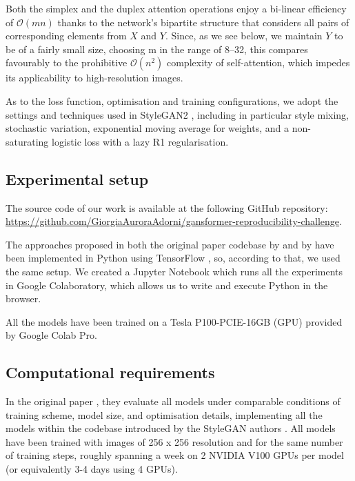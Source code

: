 \documentclass{article}
\begin{document}
Both the simplex and the duplex attention operations enjoy a bi-linear efficiency of 
$\mathcal{O}(mn)$ thanks to the network’s bipartite structure that considers all pairs of 
corresponding elements from $X$ and $Y$. Since, as we see below, we maintain $Y$ to be of a fairly 
small size, choosing m in the range of 8–32, this compares favourably to the prohibitive 	
$\mathcal{O}(n^2)$  complexity of self-attention, which impedes its applicability to high-resolution 
images.

As to the loss function, optimisation and training configurations, we adopt the settings and 
techniques used in StyleGAN2 \cite{karras2020analyzing}, including in particular style mixing, 
stochastic variation, exponential moving average for weights, and a non-saturating logistic loss with 
a lazy R1 regularisation.

\subsection{Experimental setup}	
The source code of our work is available at the following GitHub repository: 
\url{https://github.com/GiorgiaAuroraAdorni/gansformer-reproducibility-challenge}.

The approaches proposed in both the original paper codebase by \citet{karras2020analyzing} and 
by \citet{hudson2021generative} have been implemented in Python using TensorFlow 
\cite{tensorflow2015-whitepaper}, so, according to that, we used the same setup.
We created a Jupyter Notebook which runs all the experiments in Google Colaboratory, which 
allows us to write and execute Python in the browser. 

All the models have been trained on a Tesla P100-PCIE-16GB (GPU) provided by Google 
Colab Pro.

\subsection{Computational requirements}\label{sec:comput_req}

In the original paper \cite{hudson2021generative}, they evaluate all models under comparable 
conditions of training scheme, model size, and optimisation details, implementing all the models 
within the codebase introduced by the StyleGAN authors \cite{karras2020analyzing}. 
All models have been trained with images of 256 x 256 resolution and for the 
same number of training steps, roughly spanning a week on 2 NVIDIA V100 GPUs per model (or 
equivalently 3-4 days using 4 GPUs). 
\end{document}
